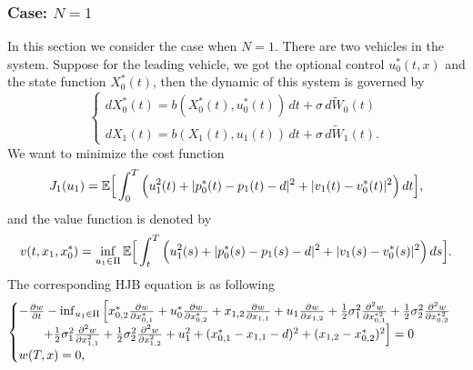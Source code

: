 \documentclass{article}
\begin{document}
\subsubsection{Case: $N = 1$}

In this section we consider the case when $N = 1$. There are two vehicles in the system. Suppose for the leading vehicle, we got the optional control $u_{0}^{*} (t, x)$ and the state function $X_{0}^{*} (t)$, then the dynamic of this system is governed by
\begin{equation}
    \begin{cases}
   d X_{0}^{*}(t) = b(X_{0}^{*}(t), u_{0}^{*}(t)) \, d t + \sigma \, d \widetilde{W}_{0}(t)  \\
   d X_{1}(t) = b(X_{1} (t), u_{1} (t)) \, d t + \sigma \, d \widetilde{W}_{1}(t).
   \end{cases}
\end{equation}
We want to minimize the cost function
\begin{equation*}
    J_{1} (u_{1}) = \mathbb{E} \Big{[} \int_{0}^{T} \Big{(} u_{1}^{2}(t) + |p_{0}^{*}(t) - p_{1}(t) - d|^{2} + |v_{1}(t) - v_{0}^{*}(t)|^{2} \Big{)} \, d t \Big{]},
\end{equation*}
and the value function is denoted by
\begin{equation*}
    v(t, x_{1}, x_{0}^{*}) = \inf_{u_{1} \in \Pi} \mathbb{E} \Big{[} \int_{t}^{T} \Big{(} u_{1}^{2}(s) + |p_{0}^{*}(s) - p_{1}(s) - d|^{2} + |v_{1}(s) - v_{0}^{*}(s)|^{2} \Big{)} \, d s \Big{]}.
\end{equation*}
The corresponding HJB equation is as following
\begin{equation} \label{HJB, N=1}
    \begin{cases}
   - \frac{\partial w}{\partial t} - \inf_{u_{1} \in \Pi} \Big{[} x_{0,2}^{*} \frac{\partial w}{\partial x_{0, 1}^{*}} + u_{0}^{*} \frac{\partial w}{\partial x_{0, 2}^{*}} + x_{1,2} \frac{\partial w}{\partial x_{1, 1}} + u_{1} \frac{\partial w}{\partial x_{1, 2}} + \frac{1}{2} \sigma_{1}^{2} \frac{\partial^{2} w}{\partial x_{0, 1}^{* 2}} + \frac{1}{2} \sigma_{2}^{2} \frac{\partial^{2} w}{\partial x_{0, 2}^{* 2}}  \\
   \qquad + \frac{1}{2} \sigma_{1}^{2} \frac{\partial^{2} w}{\partial x_{1, 1}^{2}} + \frac{1}{2} \sigma_{2}^{2} \frac{\partial^{2} w}{\partial x_{1, 2}^{2}} + u_{1}^{2} + (x_{0, 1}^{*} - x_{1, 1} - d)^{2} + (x_{1, 2} - x_{0, 2}^{*})^{2}  \Big{]}   = 0  \\
   w(T, x) = 0,
   \end{cases}
\end{equation}
\end{document}
